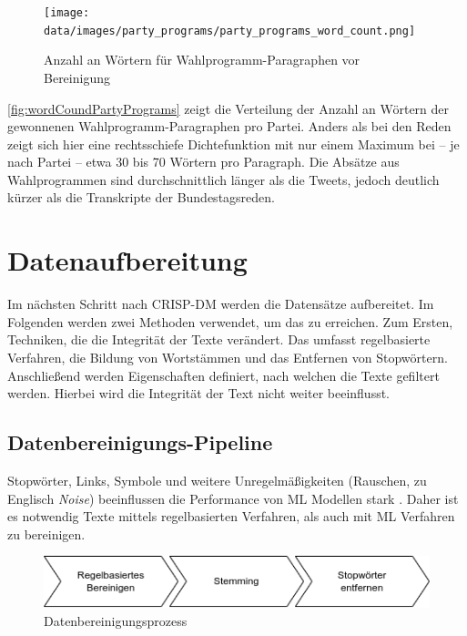 \begin{figure}[H]
    \centering
    \texttt{[image: data/images/party\_programs/party\_programs\_word\_count.png]}
    \caption{Anzahl an Wörtern für Wahlprogramm-Paragraphen vor Bereinigung} \label{fig:wordCoundPartyPrograms}
\end{figure}

\autoref{fig:wordCoundPartyPrograms} zeigt die Verteilung der Anzahl an Wörtern der gewonnenen Wahlprogramm-Paragraphen pro Partei. Anders als bei den Reden zeigt sich hier eine rechtsschiefe Dichtefunktion mit nur einem Maximum bei -- je nach Partei -- etwa \num{30} bis \num{70} Wörtern pro Paragraph. Die Absätze aus Wahlprogrammen sind durchschnittlich länger als die Tweets, jedoch deutlich kürzer als die Transkripte der Bundestagsreden. 

\section{Datenaufbereitung} \label{sec:dataPreparation}

Im nächsten Schritt nach \ac{CRISP-DM} werden die Datensätze aufbereitet. Im Folgenden werden zwei Methoden verwendet, um das zu erreichen. Zum Ersten, Techniken, die die Integrität der Texte verändert. Das umfasst regelbasierte Verfahren, die Bildung von Wortstämmen und das Entfernen von Stopwörtern. Anschließend werden Eigenschaften definiert, nach welchen die Texte gefiltert werden. Hierbei wird die Integrität der Text nicht weiter beeinflusst.

\subsection{Datenbereinigungs-Pipeline} \label{subsec:cleaningPipeline}

Stopwörter, Links, Symbole und weitere Unregelmäßigkeiten (Rauschen, zu Englisch \textit{Noise}) beeinflussen die Performance von \ac{ML} Modellen stark \autocite[4]{kowsari_text_2019}. Daher ist es notwendig Texte mittels regelbasierten Verfahren, als auch mit \ac{ML} Verfahren zu bereinigen. 


\begin{figure}[H]
    \centering
    \includegraphics[width=0.7\linewidth]{data/images/cleaning_pipeline_v1.png}
    \caption{Datenbereinigungsprozess} \label{fig:cleaningPipeline}
\end{figure}

